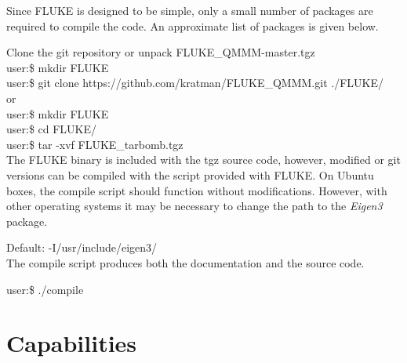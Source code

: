 \documentclass[12pt]{report}
\begin{document}
Since FLUKE is designed to be simple, only a small number of packages are
required to compile the code. An approximate list of packages is given
below.
\begin{quote}
\end{quote}

Clone the git repository or unpack FLUKE\_QMMM-master.tgz \\

user:\$ mkdir FLUKE \\
user:\$ git clone https://github.com/kratman/FLUKE\_QMMM.git ./FLUKE/ \\

or \\

user:\$ mkdir FLUKE \\
user:\$ cd FLUKE/ \\
user:\$ tar -xvf FLUKE\_tarbomb.tgz \\

The FLUKE binary is included with the tgz source code, however, modified or
git versions can be compiled with the script provided with FLUKE. On Ubuntu
boxes, the compile script should function without modifications. However, with
other operating systems it may be necessary to change the path to the
\textit{Eigen3} package.

Default: -I/usr/include/eigen3/ \\

The compile script produces both the documentation and the source code.

user:\$ ./compile

\section{Capabilities}
\end{document}
